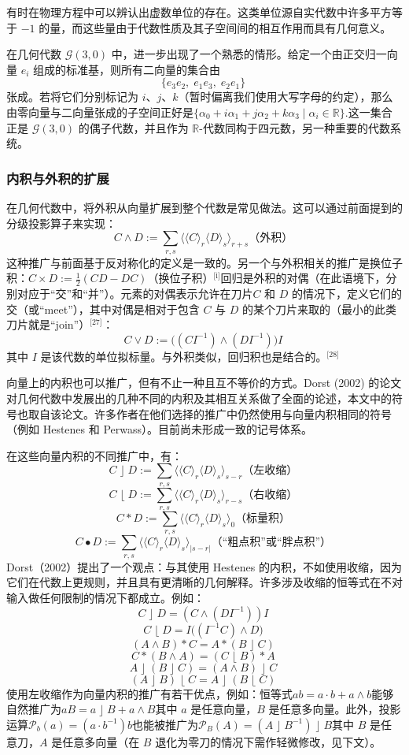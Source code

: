 有时在物理方程中可以辨认出虚数单位的存在。这类单位源自实代数中许多平方等于 $-1$ 的量，而这些量由于代数性质及其子空间间的相互作用而具有几何意义。

在几何代数 $\mathcal{G}(3,0)$ 中，进一步出现了一个熟悉的情形。给定一个由正交归一向量 $e_{i}$ 组成的标准基，则所有二向量的集合由
$$
\{e_{3}e_{2}, \; e_{1}e_{3}, \; e_{2}e_{1}\}~
$$
张成。若将它们分别标记为 $i$、$j$、$k$（暂时偏离我们使用大写字母的约定），那么由零向量与二向量张成的子空间正好是$\{\alpha_{0} + i\alpha_{1} + j \alpha_{2} + k \alpha_{3} \mid \alpha_{i} \in \mathbb{R}\}$.这一集合正是 $\mathcal{G}(3,0)$ 的偶子代数，并且作为 $\mathbb{R}$-代数同构于四元数，另一种重要的代数系统。
\subsubsection{内积与外积的扩展}
在几何代数中，将外积从向量扩展到整个代数是常见做法。这可以通过前面提到的 分级投影算子来实现：
$$
C \wedge D := \sum_{r,s} \langle \langle C \rangle_{r} \langle D \rangle_{s} \rangle_{r+s}\text{（外积）}~
$$
这种推广与前面基于反对称化的定义是一致的。另一个与外积相关的推广是换位子积：$C \times D := \tfrac{1}{2}(CD - DC)$（换位子积）\(^\text{[i]}\)回归是外积的对偶（在此语境下，分别对应于“交”和“并”）。元素的对偶表示允许在刀片$C$ 和 $D$ 的情况下，定义它们的交（或“meet”），其中对偶是相对于包含 $C$ 与 $D$ 的某个刀片来取的（最小的此类刀片就是“join”）\(^\text{[27]}\)：
$$
C \vee D := \big( (C I^{-1}) \wedge (D I^{-1}) \big) I~
$$
其中 $I$ 是该代数的单位拟标量。与外积类似，回归积也是结合的。\(^\text{[28]}\)

向量上的内积也可以推广，但有不止一种且互不等价的方式。Dorst (2002) 的论文对几何代数中发展出的几种不同的内积及其相互关系做了全面的论述，本文中的符号也取自该论文。许多作者在他们选择的推广中仍然使用与向量内积相同的符号（例如 Hestenes 和 Perwass）。目前尚未形成一致的记号体系。

在这些向量内积的不同推广中，有：
$$
C \;\rfloor\; D := \sum_{r,s} \langle \langle C \rangle_r \langle D \rangle_s \rangle_{s-r}\text{（左收缩）}~
$$
$$
C \;\lfloor\; D := \sum_{r,s} \langle \langle C \rangle_r \langle D \rangle_s \rangle_{r-s}\text{（右收缩）}~
$$
$$
C * D := \sum_{r,s} \langle \langle C \rangle_r \langle D \rangle_s \rangle_{0}\text{（标量积）}~
$$
$$
C \bullet D := \sum_{r,s} \langle \langle C \rangle_r \langle D \rangle_s \rangle_{|s-r|}\text{（“粗点积”或“胖点积”）}~
$$
Dorst（2002）提出了一个观点：与其使用 Hestenes 的内积，不如使用收缩，因为它们在代数上更规则，并且具有更清晰的几何解释。许多涉及收缩的恒等式在不对输入做任何限制的情况下都成立。例如：
$$
C \;\rfloor\; D = (C \wedge (D I^{-1})) I~
$$
$$
C \;\lfloor\; D = I \big( (I^{-1} C) \wedge D \big)~
$$
$$
(A \wedge B) * C = A * (B \;\rfloor\; C)~
$$
$$
C * (B \wedge A) = (C \;\lfloor\; B) * A~
$$
$$
A \;\rfloor\; (B \;\rfloor\; C) = (A \wedge B) \;\rfloor\; C~
$$
$$
(A \;\rfloor\; B) \;\lfloor\; C = A \;\rfloor\; (B \;\lfloor\; C)~
$$
使用左收缩作为向量内积的推广有若干优点，例如：恒等式$ab = a \cdot b+ a \wedge b$能够自然推广为$aB = a \;\rfloor\; B + a \wedge B$其中 $a$ 是任意向量，$B$ 是任意多向量。此外，投影运算$\mathcal{P}_{b}(a) = (a \cdot b^{-1}) b$也能被推广为$\mathcal{P}_{B}(A) = (A \;\rfloor\; B^{-1}) \;\rfloor\; B$其中 $B$ 是任意刀，$A$ 是任意多向量（在 $B$ 退化为零刀的情况下需作轻微修改，见下文）。
